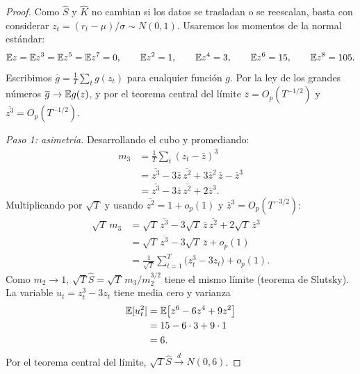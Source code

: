 \begin{proof}
Como $\hat S$ y $\hat K$ no cambian si los datos se trasladan o se reescalan, basta con considerar
$z_t=(r_t-\mu)/\sigma\sim N(0,1)$. Usaremos los momentos de la normal estándar:
\[
  \mathbb{E} z=\mathbb{E} z^3=\mathbb{E} z^5=\mathbb{E} z^7=0,\qquad \mathbb{E} z^2=1,\qquad \mathbb{E} z^4=3,\qquad \mathbb{E} z^6=15,\qquad \mathbb{E} z^8=105 .
\]
Escribimos $\overline{g}=\frac1T\sum_tg(z_t)$ para cualquier función $g$. Por la ley de los grandes números
$\overline{g}\to\mathbb{E} g(z)$, y por el teorema central del límite $\bar z=O_p(T^{-1/2})$ y
$\overline{z^3}=O_p(T^{-1/2})$.

\emph{Paso 1: asimetría.} Desarrollando el cubo y promediando:
\begin{align*}
  m_3 &= \frac1T\sum_t(z_t-\bar z)^3\\
      &= \overline{z^3}-3\bar z\,\overline{z^2}+3\bar z^2\,\bar z-\bar z^3\\
      &= \overline{z^3}-3\bar z\,\overline{z^2}+2\bar z^3.
\end{align*}
Multiplicando por $\sqrt T$ y usando $\overline{z^2}=1+o_p(1)$ y $\bar z^3=O_p(T^{-3/2})$:
\begin{align*}
  \sqrt T\,m_3 &= \sqrt T\,\overline{z^3}-3\sqrt T\,\bar z\,\overline{z^2}+2\sqrt T\,\bar z^3\\
               &= \sqrt T\,\overline{z^3}-3\sqrt T\,\bar z+o_p(1)\\
               &= \frac1{\sqrt T}\sum_{t=1}^T\bigl(z_t^3-3z_t\bigr)+o_p(1).
\end{align*}
Como $m_2\to1$, $\sqrt T\hat S=\sqrt T\,m_3/m_2^{3/2}$ tiene el mismo límite (teorema de Slutsky). La
variable $u_t=z_t^3-3z_t$ tiene media cero y varianza
\begin{align*}
  \mathbb{E}[u_t^2] &= \mathbb{E}\bigl[z^6-6z^4+9z^2\bigr]\\
            &= 15-6\cdot3+9\cdot1\\
            &= 6 .
\end{align*}
Por el teorema central del límite, $\sqrt T\hat S\xrightarrow{d}N(0,6)$.


\end{proof}
